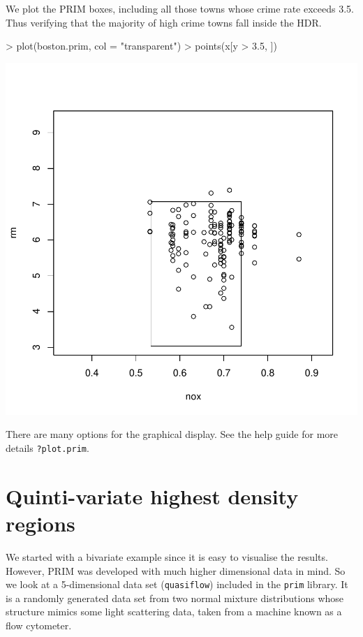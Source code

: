 \documentclass[a4paper,11pt]{article}
\begin{document}
We plot the PRIM boxes, including 
all those towns whose crime rate exceeds 3.5. Thus 
verifying that the majority of high crime towns fall inside the
HDR.
\begin{Schunk}
\begin{Sinput}
> plot(boston.prim, col = "transparent")
> points(x[y > 3.5, ])
\end{Sinput}
\end{Schunk}
\begin{center}
\includegraphics{prim-004}
\end{center}
There are many options for the graphical display. See
the help guide for more details \texttt{?plot.prim}.


\section{Quinti-variate highest density regions}
We started with a bivariate example since it is easy to visualise the
results. However, PRIM was developed with much higher dimensional data in
mind. So we look at a 5-dimensional data set (\texttt{quasiflow}) included in the
\texttt{prim} library. It is a randomly generated data set from 
two normal mixture distributions whose structure mimics  
some light scattering data, taken from a machine known as a flow cytometer. 
 
\end{document}
